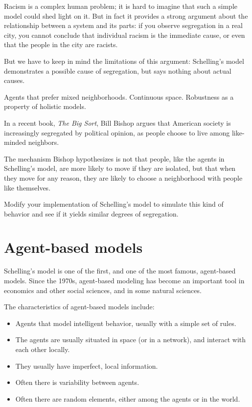 \documentclass[10pt]{book}
\begin{document}
Racism is a complex human problem; it is hard to imagine that such a
simple model could shed light on it.  But in fact it provides a strong
argument about the relationship between a system and its parts: if you
observe segregation in a real city, you cannot conclude that
individual racism is the immediate cause, or even that the people in
the city are racists.

But we have to keep in mind the limitations of this argument:
Schelling's model demonstrates a possible cause of segregation, but
says nothing about actual causes.

\begin{ex}

Agents that prefer mixed neighborhoods.  Continuous space.
Robustness as a property of holistic models.

\end{ex}


\begin{ex}

In a recent book, {\em The Big Sort}, Bill Bishop argues that
American society is increasingly segregated by political
opinion, as people choose to live among like-minded neighbors.

The mechanism Bishop hypothesizes is not that people, like the agents
in Schelling's model, are more likely to move if they are
isolated, but that when they move for any reason, they are
likely to choose a neighborhood with people like themselves.

Modify your implementation of Schelling's model to simulate
this kind of behavior and see if it yields similar degrees of
segregation. 

\end{ex}


\section{Agent-based models}

Schelling's model is one of the first, and one of the most
famous, agent-based models.  Since the 1970s, agent-based
modeling has become an important tool in economics and other
social sciences, and in some natural sciences.

The characteristics of agent-based models include:

\begin{itemize}

\item Agents that model intelligent behavior, usually with a simple
  set of rules.

\item The agents are usually situated in space (or in a network), and
  interact with each other locally.

\item They usually have imperfect, local information.

\item Often there is variability between agents.

\item Often there are random elements, either among the agents or in
  the world.

\end{itemize}
\end{document}
